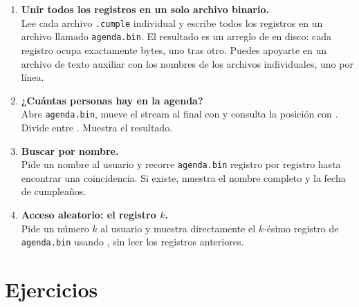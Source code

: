 \documentclass[12pt, oneside]{article}
\begin{document}
\begin{enumerate}

  \item \textbf{Unir todos los registros en un solo archivo binario.}\\
        Lee cada archivo \texttt{.cumple} individual y escribe todos los
        registros en un archivo llamado \texttt{agenda.bin}.  El resultado
        es un arreglo de  en disco: cada registro ocupa
        exactamente  bytes, uno tras otro.  Puedes
        apoyarte en un archivo de texto auxiliar con los nombres de los
        archivos individuales, uno por línea.

  \item \textbf{¿Cuántas personas hay en la agenda?}\\
        Abre \texttt{agenda.bin}, mueve el stream al final con
         y consulta la posición con .
        Divide entre .  Muestra el resultado.

  \item \textbf{Buscar por nombre.}\\
        Pide un nombre al usuario y recorre \texttt{agenda.bin} registro
        por registro hasta encontrar una coincidencia.  Si existe, muestra
        el nombre completo y la fecha de cumpleaños.

  \item \textbf{Acceso aleatorio: el registro $k$.}\\
        Pide un número $k$ al usuario y muestra directamente el
        $k$-ésimo registro de \texttt{agenda.bin} usando ,
        sin leer los registros anteriores.

\end{enumerate}

\section{Ejercicios}
\end{document}
